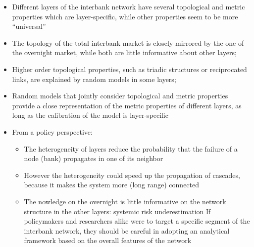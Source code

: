 \begin{itemize}
	\item Different layers of the interbank network have several topological and metric properties which are layer-specific, while other properties seem to be more “universal”
	\item The topology of the total interbank market is closely mirrored by the one of the overnight market, while both are little informative about other layers; 
	\item Higher order topological properties, such as triadic structures or reciprocated links, are explained by random models in some layers;
	\item Random models that jointly consider topological and metric properties provide a close representation of the metric properties of different layers, as long as the calibration of the model is layer-specific
	\item From a policy perspective:
	\begin{itemize}
		\item The heterogeneity of layers reduce the probability that the failure of a node (bank) propagates in one of its neighbor 
		\item However the heterogeneity could speed up the propagation of cascades, because it makes the system more (long range) connected 
		\item The nowledge on the overnight is little informative on the network structure in the other layers: systemic risk underestimation If policymakers and researchers alike were to target a specific segment of the interbank network, they should be careful in adopting an analytical framework based on the
		overall features of the network
	\end{itemize}
\end{itemize}
\newpage
